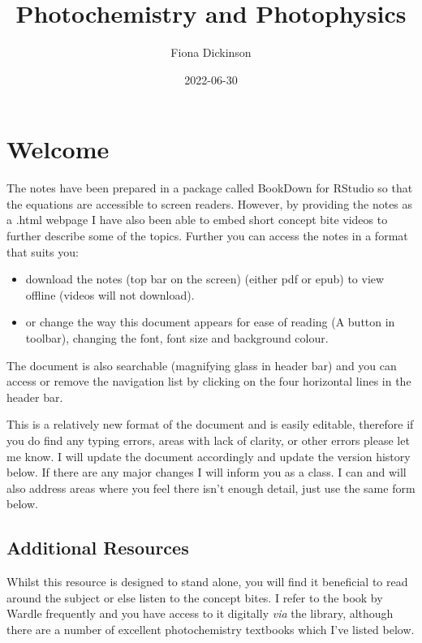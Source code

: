 \documentclass[
]{book}
\title{Photochemistry and Photophysics}
\author{Fiona Dickinson}
\date{2022-06-30}
\providecommand{\tightlist}{%
  \setlength{\itemsep}{0pt}\setlength{\parskip}{0pt}}
\begin{document}
\maketitle

{
\setcounter{tocdepth}{1}
\tableofcontents
}
\hypertarget{welcome}{%
\chapter*{Welcome}\label{welcome}}

The notes have been prepared in a package called BookDown for RStudio so that the equations are accessible to screen readers. However, by providing the notes as a .html webpage I have also been able to embed short concept bite videos to further describe some of the topics. Further you can access the notes in a format that suits you:

\begin{itemize}
\tightlist
\item
  download the notes (top bar on the screen) (either pdf or epub) to view offline (videos will not download).
\item
  or change the way this document appears for ease of reading (A button in toolbar), changing the font, font size and background colour.
\end{itemize}

The document is also searchable (magnifying glass in header bar) and you can access or remove the navigation list by clicking on the four horizontal lines in the header bar.

This is a relatively new format of the document and is easily editable, therefore if you do find any typing errors, areas with lack of clarity, or other errors please let me know. I will update the document accordingly and update the version history below. If there are any major changes I will inform you as a class. I can and will also address areas where you feel there isn't enough detail, just use the same form below.

\hypertarget{sec:AddnRes}{%
\section{Additional Resources}\label{sec:AddnRes}}

Whilst this resource is designed to stand alone, you will find it beneficial to read around the subject or else listen to the concept bites. I refer to the book by Wardle frequently and you have access to it digitally \emph{via} the library, although there are a number of excellent photochemistry textbooks which I've listed below.
\end{document}
